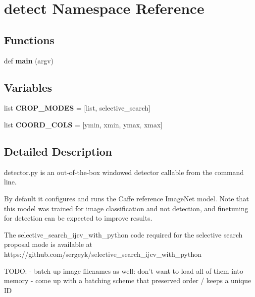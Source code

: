 \hypertarget{namespacedetect}{}\section{detect Namespace Reference}
\label{namespacedetect}
\subsection*{Functions}
\begin{DoxyCompactItemize}
\item 
\mbox{\label{namespacedetect_ade939dea8191a0c98a07c8caf288297f}} 
def {\bfseries main} (argv)
\end{DoxyCompactItemize}
\subsection*{Variables}
\begin{DoxyCompactItemize}
\item 
\mbox{\label{namespacedetect_ad4e9d92af2f0578c7449fe0da36617bb}} 
list {\bfseries C\+R\+O\+P\+\_\+\+M\+O\+D\+ES} = \mbox{[}\textquotesingle{}list\textquotesingle{}, \textquotesingle{}selective\+\_\+search\textquotesingle{}\mbox{]}
\item 
\mbox{\label{namespacedetect_a38e99af2c5095af52fc75d78c10592bf}} 
list {\bfseries C\+O\+O\+R\+D\+\_\+\+C\+O\+LS} = \mbox{[}\textquotesingle{}ymin\textquotesingle{}, \textquotesingle{}xmin\textquotesingle{}, \textquotesingle{}ymax\textquotesingle{}, \textquotesingle{}xmax\textquotesingle{}\mbox{]}
\end{DoxyCompactItemize}


\subsection{Detailed Description}
\begin{DoxyVerb}detector.py is an out-of-the-box windowed detector
callable from the command line.

By default it configures and runs the Caffe reference ImageNet model.
Note that this model was trained for image classification and not detection,
and finetuning for detection can be expected to improve results.

The selective_search_ijcv_with_python code required for the selective search
proposal mode is available at
https://github.com/sergeyk/selective_search_ijcv_with_python

TODO:
- batch up image filenames as well: don't want to load all of them into memory
- come up with a batching scheme that preserved order / keeps a unique ID
\end{DoxyVerb}
 